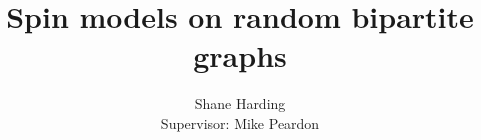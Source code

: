 \documentclass[pdf]{beamer}
\title{Spin models on random bipartite graphs}
\author{Shane Harding \\ Supervisor: Mike Peardon}
\begin{document}
\begin{frame}
\titlepage
\end{frame}

\begin{frame}
\begin{itemize}

\end{itemize}
\end{frame}


\begin{frame}

\end{frame}
\end{document}
